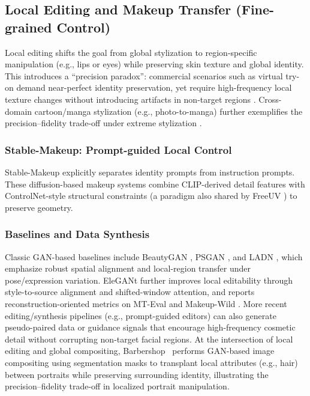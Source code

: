 \documentclass[journal]{IEEEtran}
\begin{document}
\subsection{Local Editing and Makeup Transfer (Fine-grained Control)}
\label{sec:advanced:local}
Local editing shifts the goal from global stylization to region-specific manipulation (e.g., lips or eyes) while preserving skin texture and global identity. This introduces a ``precision paradox'': commercial scenarios such as virtual try-on demand near-perfect identity preservation, yet require high-frequency local texture changes without introducing artifacts in non-target regions \cite{yan2023facestudiopy,liu2023portraitdt,ambiel2023portraitsa}. Cross-domain cartoon/manga stylization (e.g., photo-to-manga) further exemplifies the precision--fidelity trade-off under extreme stylization \cite{su2021mangagan}.

\subsubsection{Stable-Makeup: Prompt-guided Local Control}
\label{sec:advanced:local:stablemakeup}
Stable-Makeup \cite{zhang2024stablemakeup} explicitly separates identity prompts from instruction prompts. These diffusion-based makeup systems combine CLIP-derived detail features with ControlNet-style structural constraints (a paradigm also shared by FreeUV \cite{yang2025freeuv}) to preserve geometry.

\subsubsection{Baselines and Data Synthesis}
\label{sec:advanced:local:baselines}
Classic GAN-based baselines include BeautyGAN \cite{li2018beautygan}, PSGAN \cite{jiang2020psgan}, and LADN \cite{gu2019ladn}, which emphasize robust spatial alignment and local-region transfer under pose/expression variation. EleGANt further improves local editability through style-to-source alignment and shifted-window attention, and reports reconstruction-oriented metrics on MT-Eval and Makeup-Wild \cite{yang2022elegant}. More recent editing/synthesis pipelines (e.g., prompt-guided editors) can also generate pseudo-paired data or guidance signals that encourage high-frequency cosmetic detail without corrupting non-target facial regions. At the intersection of local editing and global compositing, Barbershop~\cite{zhu2021barbershop} performs GAN-based image compositing using segmentation masks to transplant local attributes (e.g., hair) between portraits while preserving surrounding identity, illustrating the precision--fidelity trade-off in localized portrait manipulation.
\end{document}
